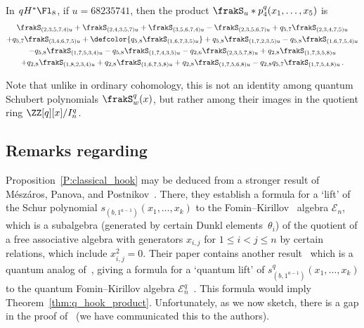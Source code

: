 \begin{example}\label{Ex:MN_example}
In $qH^*\Fl_8$, if $u=68235741$, then the product $\frakS_{u}\ast p^q_4(x_1,\dotsc,x_5)$ is
\begin{gather*}
      \frakS_{(2,3,5,7,4)u}
    + \frakS_{(2,4,3,5,7)u}
    + \frakS_{(3,5,6,7,4)u}
    - \frakS_{(2,3,5,6,7)u}
    + q_{5,7}\frakS_{(2,3,4,7,5)u}
    \\
    + q_{5,7}\frakS_{(3,4,6,7,5)u}
    + \defcolor{q_{5,8}\frakS_{(1,6,7,3,5)u}}
    + q_{5,8}\frakS_{(1,7,2,3,5)u}
    - q_{5,8}\frakS_{(1,6,7,5,4)u}
    \\
    - q_{5,8}\frakS_{(1,7,5,3,4)u}
    - q_{5,8}\frakS_{(1,7,4,3,5)u}
    - q_{2,6}\frakS_{(2,3,5,7,8)u}
    + q_{2,8}\frakS_{(1,7,3,5,8)u}
    \\
    + q_{2,8}\frakS_{(1,8,2,3,4)u}
    + q_{2,8}\frakS_{(1,6,7,5,8)u}
    + q_{2,8}\frakS_{(1,7,5,6,8)u}
    -q_{2,8}q_{5,7}\frakS_{(1,7,5,4,8)u} \,.
\end{gather*}

Note that unlike in ordinary cohomology, this is not an identity among quantum Schubert polynomials $\frakS^q_w(x)$,
but rather among their images in the quotient ring $\ZZ[q][x]/I^q_n$.
\end{example}

\subsection{Remarks regarding~\texorpdfstring{\cite[Thm.~15]{MPP}}{[25, Thm. 15]}}\label{SS:R_MPP}

Proposition~\ref{P:classical_hook} may be deduced from a stronger result of M\'esz\'aros, Panova, and
Postnikov~\cite[Thm.~8]{MPP}.
There, they establish a formula for a `lift' of the Schur polynomial
$s_{(b,1^{a-1})}(x_1,\dotsc,x_k)$ to the Fomin--Kirillov~\cite{FominKirillov}
algebra ${\mathcal E}_n$, which is a subalgebra (generated by certain Dunkl elements~$\theta_i$) of the quotient of a free
associative algebra with generators $x_{i,j}$ for $1\leq i<j\leq n$ by certain relations, which include $x_{i,j}^2=0$.
Their paper contains another result~\cite[Thm.~15]{MPP} which is a quantum analog of~\cite[Thm.~8]{MPP}, giving a formula
for a `quantum lift' of $s^q_{(b,1^{a-1})}(x_1,\dotsc,x_k)$ to the quantum Fomin--Kirillov algebra
$\mathcal{E}^q_n$~\cite{Postnikov}.
This formula would imply Theorem~\ref{thm:q_hook_product}.
Unfortunately, as we now sketch, there is a gap in the proof of~\cite[Thm.~15]{MPP} (we have communicated this to the
authors).


